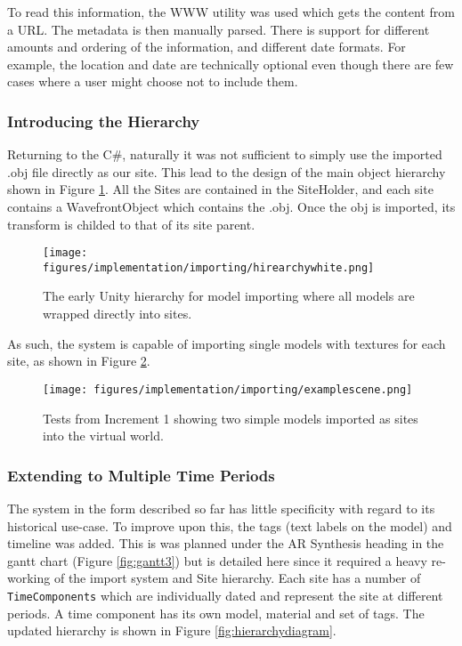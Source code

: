 \documentclass[12pt, a4paper]{article}
\begin{document}
To read this information, the WWW utility \cite{models:www} was used which gets the content from a URL. The metadata is then manually parsed. There is support for different amounts and ordering of the information, and different date formats. For example, the location and date are technically optional even though there are few cases where a user might choose not to include them.

\subsubsection{Introducing the Hierarchy}
Returning to the C\#, naturally it was not sufficient to simply use the imported .obj file directly as our site. This lead to the design of the main object hierarchy shown in Figure \ref{fig:initialhirearchy}. All the Sites are contained in the SiteHolder, and each \gls{site} contains a WavefrontObject which contains the .obj. Once the obj is imported, its transform is childed to that of its site parent.

\begin{figure}[h]
    \centering
    \texttt{[image: figures/implementation/importing/hirearchywhite.png]}
        \caption{The early Unity hierarchy for model importing where all models are wrapped directly into sites.}
        \label{fig:initialhirearchy}
\end{figure}

As such, the system is capable of importing single models with textures for each site, as shown in Figure \ref{fig:earlyimportedscene}.

\begin{figure}[h]
    \centering
    \texttt{[image: figures/implementation/importing/examplescene.png]}
        \caption{Tests from Increment 1 showing two simple models imported as sites into the virtual world.}
        \label{fig:earlyimportedscene}
\end{figure}

\subsubsection{Extending to Multiple Time Periods}
The system in the form described so far has little specificity with regard to its historical use-case. To improve upon this, the tags (text labels on the model) and timeline was added. This is was planned under the AR Synthesis heading in the gantt chart (Figure \ref{fig:gantt3}) but is detailed here since it required a heavy re-working of the import system and Site hierarchy. Each site has a number of \verb|TimeComponents| which are individually dated and represent the site at different periods. A time component has its own model, material and set of tags. The updated hierarchy is shown in Figure \ref{fig:hierarchydiagram}.
\end{document}

